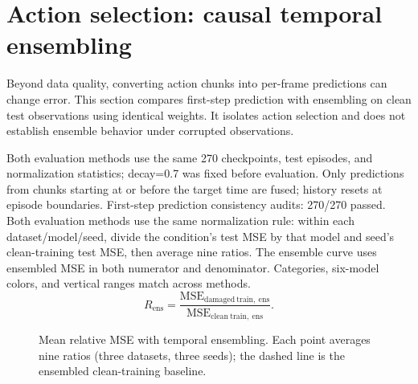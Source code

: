 \documentclass[11pt,a4paper]{article}
\begin{document}
\clearpage\section{Action selection: causal temporal ensembling}
Beyond data quality, converting action chunks into per-frame predictions can change error. This section compares first-step prediction with ensembling on clean test observations using identical weights. It isolates action selection and does not establish ensemble behavior under corrupted observations.


Both evaluation methods use the same 270 checkpoints, test episodes, and normalization statistics; decay=0.7 was fixed before evaluation. Only predictions from chunks starting at or before the target time are fused; history resets at episode boundaries. First-step prediction consistency audits: 270/270 passed.
Both evaluation methods use the same normalization rule: within each dataset/model/seed, divide the condition's test MSE by that model and seed's clean-training test MSE, then average nine ratios. The ensemble curve uses ensembled MSE in both numerator and denominator. Categories, six-model colors, and vertical ranges match across methods.
\[R_{\mathrm{ens}}=\frac{\mathrm{MSE}_{\mathrm{damaged\ train,\ ens}}}{\mathrm{MSE}_{\mathrm{clean\ train,\ ens}}}.\]
\begin{figure}[H]\centering{}\caption{Mean relative MSE with temporal ensembling. Each point averages nine ratios (three datasets, three seeds); the dashed line is the ensembled clean-training baseline.}\end{figure}
\end{document}
